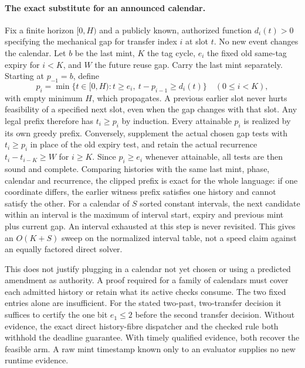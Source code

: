 \documentclass[11pt]{article}
\begin{document}
\paragraph{The exact substitute for an announced calendar.}
Fix a finite horizon \([0,H)\) and a publicly known, authorized function \(d_i(t)>0\) specifying the mechanical gap for transfer index \(i\) at slot \(t\). No new event changes the calendar. Let \(b\) be the last mint, \(K\) the tag cycle, \(e_i\) the fixed old same-tag expiry for \(i<K\), and \(W\) the future reuse gap. Carry the last mint separately. Starting at \(p_{-1}=b\), define
\[
 p_i=\min\{t\in[0,H): t\ge e_i,\ t-p_{i-1}\ge d_i(t)\}\quad(0\leq i<K),
\]
with empty minimum \(H\), which propagates. A previous earlier slot never hurts feasibility of a specified next slot, even when the gap changes with that slot. Any legal prefix therefore has \(t_i\ge p_i\) by induction. Every attainable \(p_i\) is realized by its own greedy prefix. Conversely, supplement the actual chosen gap tests with \(t_i\ge p_i\) in place of the old expiry test, and retain the actual recurrence \(t_i-t_{i-K}\ge W\) for \(i\ge K\). Since \(p_i\ge e_i\) whenever attainable, all tests are then sound and complete. Comparing histories with the same last mint, phase, calendar and recurrence, the clipped prefix is exact for the whole language: if one coordinate differs, the earlier witness prefix satisfies one history and cannot satisfy the other. For a calendar of \(S\) sorted constant intervals, the next candidate within an interval is the maximum of interval start, expiry and previous mint plus current gap. An interval exhausted at this step is never revisited. This gives an \(O(K+S)\) sweep on the normalized interval table, not a speed claim against an equally factored direct solver.
\par
This does not justify plugging in a calendar not yet chosen or using a predicted amendment as authority. A proof required for a family of calendars must cover each admitted history or retain what its active checks consume. The two fixed entries alone are insufficient. For the stated two-past, two-transfer decision it suffices to certify the one bit \(e_1\leq2\) before the second transfer decision. Without evidence, the exact direct history-fibre dispatcher and the checked rule both withhold the deadline guarantee. With timely qualified evidence, both recover the feasible arm. A raw mint timestamp known only to an evaluator supplies no new runtime evidence.
\end{document}

